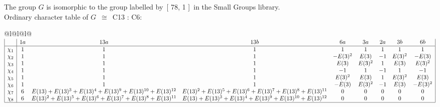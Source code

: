 \documentclass[varwidth=\maxdimen,border=10]{standalone}
\begin{document}
The group $G$ is isomorphic to the group labelled by\ [ 78, 1 ]\ in the Small Groups library.\\
Ordinary character table of $G$\ $\cong$\ C13 : C6:\\
\begin{center}
\begin{tabular}{@{}l@{}l@{}l@{}}
\hline
\(\begin{array}{|l|cccccccc|}
  & 1a & 13a & 13b & 6a & 3a & 2a & 3b & 6b\\ \hline
\chi_{1} & 1 & 1 & 1 & 1 & 1 & 1 & 1 & 1\\
\chi_{2} & 1 & 1 & 1 & -E(3)^{2} & E(3) & -1 & E(3)^{2} & -E(3)\\
\chi_{3} & 1 & 1 & 1 & E(3) & E(3)^{2} & 1 & E(3) & E(3)^{2}\\
\chi_{4} & 1 & 1 & 1 & -1 & 1 & -1 & 1 & -1\\
\chi_{5} & 1 & 1 & 1 & E(3)^{2} & E(3) & 1 & E(3)^{2} & E(3)\\
\chi_{6} & 1 & 1 & 1 & -E(3) & E(3)^{2} & -1 & E(3) & -E(3)^{2}\\
\chi_{7} & 6 & E(13)+E(13)^{3}+E(13)^{4}+E(13)^{9}+E(13)^{10}+E(13)^{12} & E(13)^{2}+E(13)^{5}+E(13)^{6}+E(13)^{7}+E(13)^{8}+E(13)^{11} & 0 & 0 & 0 & 0 & 0\\
\chi_{8} & 6 & E(13)^{2}+E(13)^{5}+E(13)^{6}+E(13)^{7}+E(13)^{8}+E(13)^{11} & E(13)+E(13)^{3}+E(13)^{4}+E(13)^{9}+E(13)^{10}+E(13)^{12} & 0 & 0 & 0 & 0 & 0\\
\hline
\end{array}\)\\
\end{tabular}
\end{center}
\end{document}
